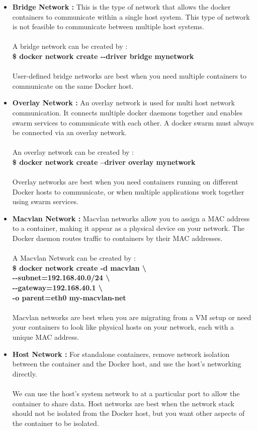 \documentclass[12pt]{article}
\begin{document}
\begin{itemize}
	\item \textbf{Bridge Network : }This is the type of network that allows the docker containers to communicate within a single host system. This type of network is not feasible to communicate between multiple host systems.\\\\
	A bridge network can be created by :\\
	\textbf{\$ docker network create -{}-driver bridge mynetwork}\\\\
	User-defined bridge networks are best when you need multiple containers to communicate on the same Docker host.
	\item \textbf{Overlay Network : }An overlay network is used for multi host network communication. It connects multiple docker daemons together and enables swarm services to communicate with each other. A docker swarm must always be connected via an overlay network.\\\\
	An overlay network can be created by :\\
	\textbf{\$ docker network create --driver overlay mynetwork}\\\\
	Overlay networks are best when you need containers running on different Docker hosts to communicate, or when multiple applications work together using swarm services.
	\item \textbf{Macvlan Network : }Macvlan networks allow you to assign a MAC address to a container, making it appear as a physical device on your network. The Docker daemon routes traffic to containers by their MAC addresses.\\\\
	A Macvlan Network can be created by :\\
	\textbf{\$ docker network create -d macvlan \textbackslash \\
		-{}-subnet=192.168.40.0/24 \textbackslash \\
		-{}-gateway=192.168.40.1 \textbackslash \\
		-o parent=eth0 my-macvlan-net\\\\
	}
	Macvlan networks are best when you are migrating from a VM setup or need your containers to look like physical hosts on your network, each with a unique MAC address.
	\item \textbf{Host Network : }For standalone containers, remove network isolation between the container and the Docker host, and use the host’s networking directly.\\\\
	We can use the host’s system network to at a particular port to allow the container to share data. Host networks are best when the network stack should not be isolated from the Docker host, but you want other aspects of the container to be isolated.
\end{itemize}
\end{document}
